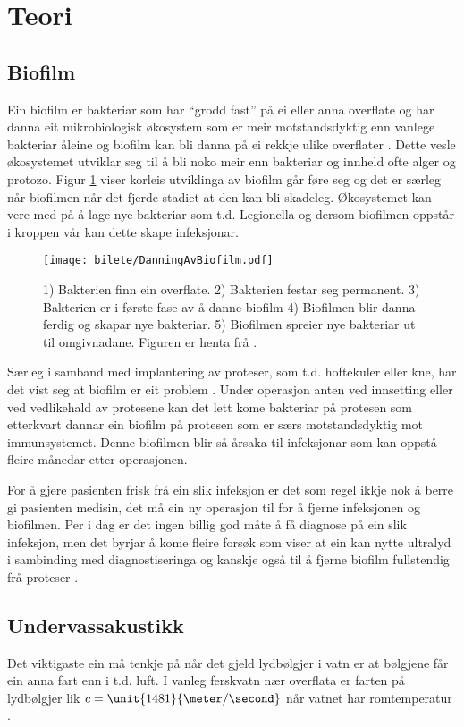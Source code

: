 \section{Teori}
\subsection{Biofilm}
Ein biofilm er bakteriar som har ``grodd fast'' på ei eller anna overflate og har danna eit mikrobiologisk økosystem som er meir motstandsdyktig enn vanlege bakteriar åleine og biofilm kan bli danna på ei rekkje ulike overflater \cite{biofilm}\cite{biofilm2}. Dette vesle økosystemet utviklar seg til å bli noko meir enn bakteriar og innheld ofte alger og protozo. Figur \ref{fig:biofilm} viser korleis utviklinga av biofilm går føre seg og det er særleg når biofilmen når det fjerde stadiet at den kan bli skadeleg. Økosystemet kan vere med på å lage nye bakteriar som t.d. Legionella \cite{biofilm} og dersom biofilmen oppstår i kroppen vår kan dette skape infeksjonar.

\begin{figure}[htbp]
  \texttt{[image: bilete/DanningAvBiofilm.pdf]}
  \caption[Dei fem fasene i biofilmdanning]{1) Bakterien finn ein overflate. 2) Bakterien festar seg permanent. 3) Bakterien er i første fase av å danne biofilm 4) Biofilmen blir danna ferdig og skapar nye bakteriar. 5) Biofilmen spreier nye bakteriar ut til omgivnadane. Figuren er henta frå \cite{biofilmfigur}.}
  \label{fig:biofilm}
\end{figure}

Særleg i samband med implantering av proteser, som t.d. hoftekuler eller kne, har det vist seg at biofilm er eit problem \cite{ultraprotese}. Under operasjon anten ved innsetting eller ved vedlikehald av protesene kan det lett kome bakteriar på protesen som etterkvart dannar ein biofilm på protesen som er særs motstandsdyktig mot immunsystemet. Denne biofilmen blir så årsaka til infeksjonar som kan oppstå fleire månedar etter operasjonen. 

For å gjere pasienten frisk frå ein slik infeksjon er det som regel ikkje nok å berre gi pasienten medisin, det må ein ny operasjon til for å fjerne infeksjonen og biofilmen\cite{infection}. Per i dag er det ingen billig god måte å få diagnose på ein slik infeksjon, men det byrjar å kome fleire forsøk som viser at ein kan nytte ultralyd i sambinding med diagnostiseringa og kanskje også til å fjerne biofilm fullstendig frå proteser \cite{ultraprotese}.

\subsection{Undervassakustikk}
Det viktigaste ein må tenkje på når det gjeld lydbølgjer i vatn er at bølgjene får ein anna fart enn i t.d. luft. I vanleg ferskvatn nær overflata er farten på lydbølgjer lik $c = \unit{1481}{\meter / \second}$ når vatnet har romtemperatur \cite[s. 630]{citeulike:4412590}.
